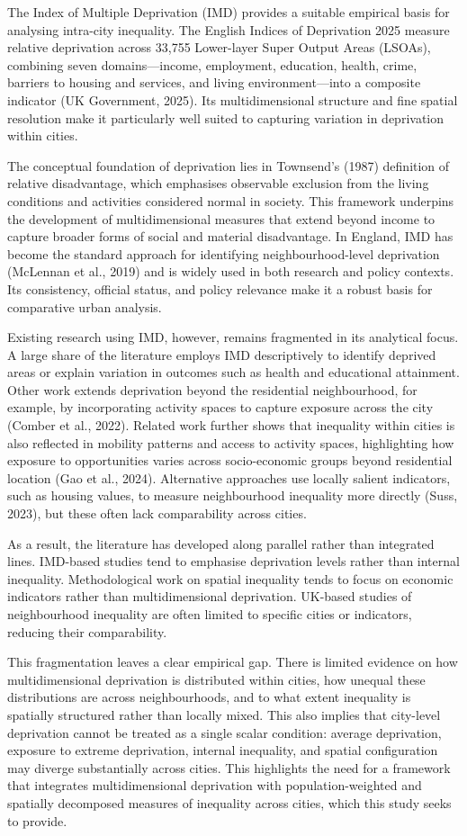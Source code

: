 The Index of Multiple Deprivation (IMD) provides a suitable empirical basis for analysing intra-city inequality. The English Indices of Deprivation 2025 measure relative deprivation across 33,755 Lower-layer Super Output Areas (LSOAs), combining seven domains---income, employment, education, health, crime, barriers to housing and services, and living environment---into a composite indicator (UK Government, 2025). Its multidimensional structure and fine spatial resolution make it particularly well suited to capturing variation in deprivation within cities.

The conceptual foundation of deprivation lies in Townsend's (1987) definition of relative disadvantage, which emphasises observable exclusion from the living conditions and activities considered normal in society. This framework underpins the development of multidimensional measures that extend beyond income to capture broader forms of social and material disadvantage. In England, IMD has become the standard approach for identifying neighbourhood-level deprivation (McLennan et al., 2019) and is widely used in both research and policy contexts. Its consistency, official status, and policy relevance make it a robust basis for comparative urban analysis.

Existing research using IMD, however, remains fragmented in its analytical focus. A large share of the literature employs IMD descriptively to identify deprived areas or explain variation in outcomes such as health and educational attainment. Other work extends deprivation beyond the residential neighbourhood, for example, by incorporating activity spaces to capture exposure across the city (Comber et al., 2022). Related work further shows that inequality within cities is also reflected in mobility patterns and access to activity spaces, highlighting how exposure to opportunities varies across socio-economic groups beyond residential location (Gao et al., 2024). Alternative approaches use locally salient indicators, such as housing values, to measure neighbourhood inequality more directly (Suss, 2023), but these often lack comparability across cities.

As a result, the literature has developed along parallel rather than integrated lines. IMD-based studies tend to emphasise deprivation levels rather than internal inequality. Methodological work on spatial inequality tends to focus on economic indicators rather than multidimensional deprivation. UK-based studies of neighbourhood inequality are often limited to specific cities or indicators, reducing their comparability.

This fragmentation leaves a clear empirical gap. There is limited evidence on how multidimensional deprivation is distributed within cities, how unequal these distributions are across neighbourhoods, and to what extent inequality is spatially structured rather than locally mixed. This also implies that city-level deprivation cannot be treated as a single scalar condition: average deprivation, exposure to extreme deprivation, internal inequality, and spatial configuration may diverge substantially across cities. This highlights the need for a framework that integrates multidimensional deprivation with population-weighted and spatially decomposed measures of inequality across cities, which this study seeks to provide.
